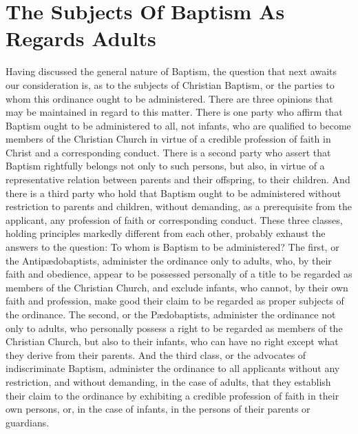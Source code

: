 \documentclass[]{book}
\begin{document}
\hypertarget{the-subjects-of-baptism-as-regards-adults}{%
\section{The Subjects Of Baptism As Regards Adults}\label{the-subjects-of-baptism-as-regards-adults}}

Having discussed the general nature of Baptism, the question that next awaits our consideration is, as to the subjects of Christian Baptism, or the parties to whom this ordinance ought to be administered. There are three opinions that may be maintained in regard to this matter. There is one party who affirm that Baptism ought to be administered to all, not infants, who are qualified to become members of the Christian Church in virtue of a credible profession of faith in Christ and a corresponding conduct. There is a second party who assert that Baptism rightfully belongs not only to such persons, but also, in virtue of a representative relation between parents and their offspring, to their children. And there is a third party who hold that Baptism ought to be administered without restriction to parents and children, without demanding, as a prerequisite from the applicant, any profession of faith or corresponding conduct. These three classes, holding principles markedly different from each other, probably exhaust the answers to the question: To whom is Baptism to be administered? The first, or the Antipædobaptists, administer the ordinance only to adults, who, by their faith and obedience, appear to be possessed personally of a title to be regarded as members of the Christian Church, and exclude infants, who cannot, by their own faith and profession, make good their claim to be regarded as proper subjects of the ordinance. The second, or the Pædobaptists, administer the ordinance not only to adults, who personally possess a right to be regarded as members of the Christian Church, but also to their infants, who can have no right except what they derive from their parents. And the third class, or the advocates of indiscriminate Baptism, administer the ordinance to all applicants without any restriction, and without demanding, in the case of adults, that they establish their claim to the ordinance by exhibiting a credible profession of faith in their own persons, or, in the case of infants, in the persons of their parents or guardians.
\end{document}
